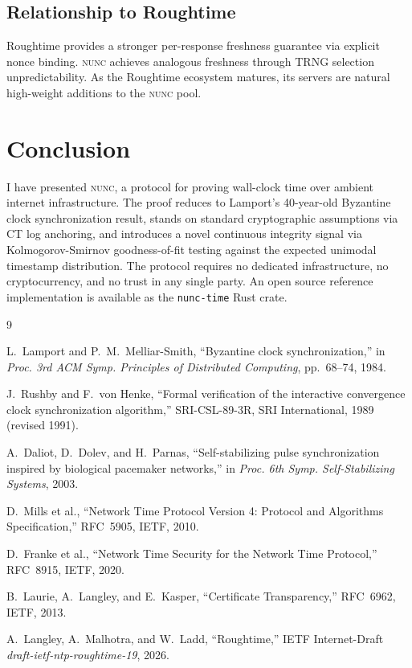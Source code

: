 \documentclass[11pt,twocolumn]{article}
\begin{document}
\subsection{Relationship to Roughtime}

Roughtime provides a stronger per-response freshness guarantee via explicit
nonce binding.  \textsc{nunc} achieves analogous freshness through TRNG
selection unpredictability.  As the Roughtime ecosystem matures, its servers
are natural high-weight additions to the \textsc{nunc} pool.

\section{Conclusion}

I have presented \textsc{nunc}, a protocol for proving wall-clock time over
ambient internet infrastructure.  The proof reduces to Lamport's 40-year-old
Byzantine clock synchronization result, stands on standard cryptographic
assumptions via CT log anchoring, and introduces a novel continuous integrity
signal via Kolmogorov-Smirnov goodness-of-fit testing against the expected
unimodal timestamp distribution.  The protocol requires no dedicated
infrastructure, no cryptocurrency, and no trust in any single party.  An open
source reference implementation is available as the \texttt{nunc-time} Rust
crate.

\begin{thebibliography}{9}

  L.~Lamport and P.~M.~Melliar-Smith,
  ``Byzantine clock synchronization,''
  in \textit{Proc. 3rd ACM Symp. Principles of Distributed Computing},
  pp.~68--74, 1984.

  J.~Rushby and F.~von Henke,
  ``Formal verification of the interactive convergence clock synchronization
  algorithm,''
  SRI-CSL-89-3R, SRI International, 1989 (revised 1991).

  A.~Daliot, D.~Dolev, and H.~Parnas,
  ``Self-stabilizing pulse synchronization inspired by biological pacemaker
  networks,''
  in \textit{Proc. 6th Symp. Self-Stabilizing Systems}, 2003.

  D.~Mills et al.,
  ``Network Time Protocol Version 4: Protocol and Algorithms Specification,''
  RFC~5905, IETF, 2010.

  D.~Franke et al.,
  ``Network Time Security for the Network Time Protocol,''
  RFC~8915, IETF, 2020.

  B.~Laurie, A.~Langley, and E.~Kasper,
  ``Certificate Transparency,''
  RFC~6962, IETF, 2013.

  A.~Langley, A.~Malhotra, and W.~Ladd,
  ``Roughtime,''
  IETF Internet-Draft \textit{draft-ietf-ntp-roughtime-19}, 2026.

\end{thebibliography}
\end{document}
